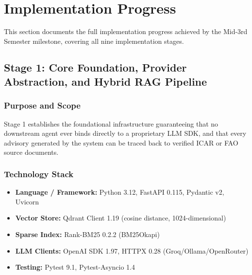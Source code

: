 \documentclass[12pt,a4paper]{article}
\begin{document}
\clearpage
\section{Implementation Progress}

This section documents the full implementation progress achieved by the Mid-3rd Semester milestone, covering all nine implementation stages.

\subsection{Stage 1: Core Foundation, Provider Abstraction, and Hybrid RAG Pipeline}

\subsubsection{Purpose and Scope}
Stage 1 establishes the foundational infrastructure guaranteeing that no downstream agent ever binds directly to a proprietary LLM SDK, and that every advisory generated by the system can be traced back to verified ICAR or FAO source documents.

\subsubsection{Technology Stack}
\begin{itemize}
\item \textbf{Language / Framework:} Python 3.12, FastAPI 0.115, Pydantic v2, Uvicorn
\item \textbf{Vector Store:} Qdrant Client 1.19 (cosine distance, 1024-dimensional)
\item \textbf{Sparse Index:} Rank-BM25 0.2.2 (BM25Okapi)
\item \textbf{LLM Clients:} OpenAI SDK 1.97, HTTPX 0.28 (Groq/Ollama/OpenRouter)
\item \textbf{Testing:} Pytest 9.1, Pytest-Asyncio 1.4
\end{itemize}
\end{document}
